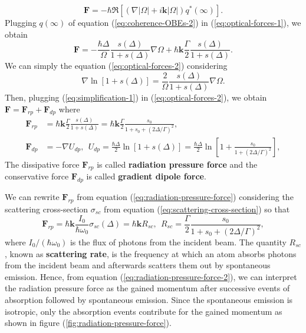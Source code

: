 {\begin{equation}
	\mathbf{F} = -\hbar \Re[(\nabla|\Omega| + i\mathbf{k}|\Omega|)q^*(\infty)].
	\label{eq:optical-forces-1}
\end{equation}
Plugging $ q(\infty) $ of equation (\ref{eq:coherence-OBEs-2}) in (\ref{eq:optical-forces-1}), we obtain
\begin{equation}
	\mathbf{F} = -\frac{\hbar \Delta}{\Omega} \frac{s(\Delta)}{1 + s(\Delta)}\nabla \Omega  + \hbar\mathbf{k} \frac{\Gamma}{2} \frac{s(\Delta)}{1 + s(\Delta)}.
	\label{eq:optical-forces-2}
\end{equation}
We can simply the equation (\ref{eq:optical-forces-2}) considering
\begin{equation}
	\nabla \ln\left[1 + s(\Delta) \right] = \frac{2}{\Omega} \frac{s(\Delta)}{1 + s(\Delta)} \nabla \Omega.
	\label{eq:simplification-1}
\end{equation}
Then, plugging (\ref{eq:simplification-1}) in (\ref{eq:optical-forces-2}), we obtain $ \mathbf{F} = \mathbf{F}_{rp} + \mathbf{F}_{dp} $ where
\begin{align}
	\mathbf{F}_{rp} &= \hbar \mathbf{k} \frac{\Gamma}{2} \frac{s(\Delta)}{1 + s(\Delta)} = \hbar \mathbf{k} \frac{\Gamma}{2} \frac{s_0}{1 + s_0 + (2\Delta/\Gamma)^2},
	\label{eq:radiation-pressure-force}
	\\
	\mathbf{F}_{dp} &= -\nabla U_{dp},\ \ U_{dp} = \frac{\hbar \Delta}{2} \ln\left[1 + s(\Delta) \right] = \frac{\hbar \Delta}{2} \ln\left[1 + \frac{s_0}{1 + (2\Delta/\Gamma)^2} \right],
	\label{eq:gradient-dipole-force}
\end{align}
The dissipative force $ \mathbf{F}_{rp} $ is called \textbf{radiation pressure force} and the conservative force $ \mathbf{F}_{dp} $ is called \textbf{gradient dipole force}.

We can rewrite $ \mathbf{F}_{rp} $ from equation (\ref{eq:radiation-pressure-force}) considering the scattering cross-section $ \sigma_{sc} $ from equation (\ref{eq:scattering-cross-section}) so that
\begin{equation}
	\mathbf{F}_{rp} = \hbar \mathbf{k} \frac{I_0}{\hbar \omega_0} \sigma_{sc}(\Delta) = \hbar \mathbf{k} R_{sc},\ \ R_{sc} = \frac{\Gamma}{2}\frac{s_0}{1 + s_0 +  (2\Delta / \Gamma)^2},
	\label{eq:radiation-pressure-force-2}
\end{equation}
where $ I_0 / (\hbar \omega_0) $ is the flux of photons from the incident beam. The quantity $ R_{sc} $, known as \textbf{scattering rate}, is the frequency at which an atom absorbs photons from the incident beam and afterwards scatters them out by spontaneous emission. Hence, from equation (\ref{eq:radiation-pressure-force-2}), we can interpret the radiation pressure force as the gained momentum after successive events of absorption followed by spontaneous emission. Since the spontaneous emission is isotropic, only the absorption events contribute for the gained momentum as shown in figure (\ref{fig:radiation-pressure-force}).

}

